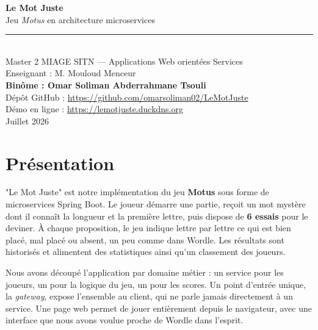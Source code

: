 \documentclass[11pt,a4paper]{article}
\begin{document}
\begin{center}
  {\LARGE\bfseries Le Mot Juste}\\[2pt]
  {\large Jeu \textit{Motus} en architecture microservices}\\[6pt]
  {\color{accent}\rule{0.5\linewidth}{1pt}}\\[8pt]
  {\normalsize Master 2 MIAGE SITN --- Applications Web orientées Services}\\[2pt]
  {\normalsize Enseignant : M. Mouloud Menceur}\\[8pt]
  {\large\bfseries Binôme : Omar Soliman \quad\textbullet\quad Abderrahmane Tsouli}\\[4pt]
  {\small Dépôt GitHub : \url{https://github.com/omarsoliman02/LeMotJuste}}\\[1pt]
  {\small Démo en ligne : \url{https://lemotjuste.duckdns.org}}\\[2pt]
  {\small Juillet 2026}
\end{center}
\vspace{4pt}

\section{Présentation}
"Le Mot Juste" est notre implémentation du jeu \textbf{Motus} sous forme de
microservices Spring Boot. Le joueur démarre une partie, reçoit un mot mystère dont
il connaît la longueur et la première lettre, puis dispose de \textbf{6 essais} pour
le deviner. À chaque proposition, le jeu indique lettre par lettre ce qui est bien
placé, mal placé ou absent, un peu comme dans Wordle. Les résultats sont historisés
et alimentent des statistiques ainsi qu'un classement des joueurs.

Nous avons découpé l'application par domaine métier : un service pour les joueurs, un
pour la logique du jeu, un pour les scores. Un point d'entrée unique, la
\textit{gateway}, expose l'ensemble au client, qui ne parle jamais directement à un
service. Une page web permet de jouer entièrement depuis le navigateur, avec une
interface que nous avons voulue proche de Wordle dans l'esprit.

\end{document}
